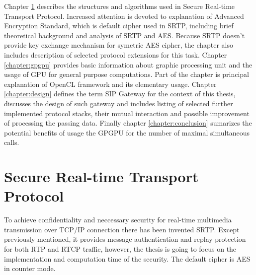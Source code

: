 Chapter \ref{chapter:srtp} describes the structures and algorithms used in 
Secure Real-time Transport Protocol. Increased attention is devoted to 
explanation of Advanced Encryption Standard, which is default cipher used in 
SRTP, including brief theoretical background and analysis of SRTP and AES. 
Because SRTP doesn't provide key exchange mechanism for symetric AES cipher, the
chapter also includes description of selected protocol extensions for this task.
Chapter \ref{chapter:gpgpu} provides basic information about graphic processing 
unit and the usage of GPU for general purpose computations. Part of the chapter 
is principal explanation of OpenCL framework and its elementary usage. 
Chapter \ref{chapter:design} defines the term SIP Gateway for the context of 
this thesis, discusses the design of such gateway and includes
listing of selected further implemented protocol stacks, their mutual 
interaction and possible improvement of processing the passing data. 
Finally chapter \ref{chapter:conclusion} sumarizes the potential benefits of 
usage the GPGPU for the number of maximal simultaneous calls.









\chapter{Secure Real-time Transport Protocol}\label{chapter:srtp}
To achieve confidentiality and neccessary security for real-time multimedia
transmission over TCP/IP connection there has been invented SRTP\cite{
rfc3711}. Except previously mentioned, it provides message
authentication and replay protection for both RTP and RTCP traffic, 
however, the thesis is going to focus on the implementation and computation
time of the security. The default cipher is AES in counter mode.

